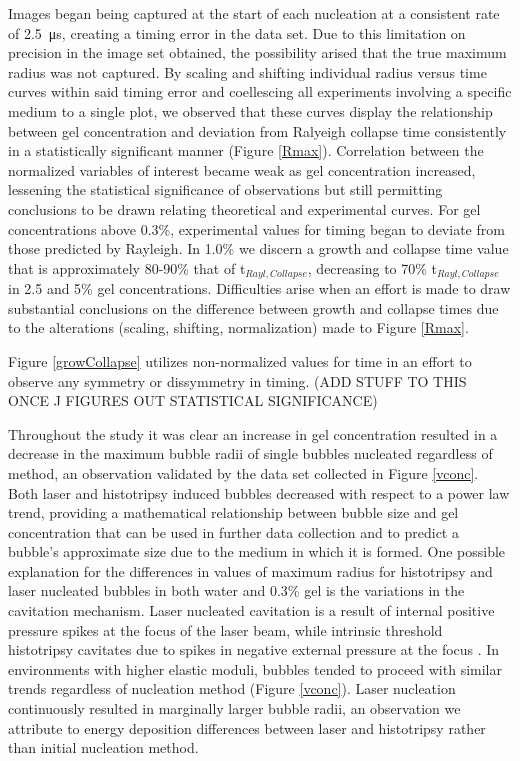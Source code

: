 \documentclass[prl,aps,epsf,twocolumn,superscriptaddress]{revtex4-1}
\begin{document}
Images began being captured at the start of each nucleation at a consistent rate of \SI{2.5}{\us}, creating a timing error in the data set. Due to this limitation on precision in the image set obtained, the possibility arised that the true maximum radius was not captured. By scaling and shifting individual radius versus time curves within said timing error and coellescing all experiments involving a specific medium to a single plot, we observed that these curves display the relationship between gel concentration and deviation from Ralyeigh collapse time consistently in a statistically significant manner (Figure \ref{Rmax}). Correlation between the normalized variables of interest became weak as gel concentration increased, lessening the statistical significance of observations but still permitting conclusions to be drawn relating theoretical and experimental curves. For gel concentrations above 0.3\%, experimental values for timing began to deviate from those predicted by Rayleigh. In 1.0\% we discern a growth and collapse time value that is approximately 80-90\% that of t$_{Rayl,Collapse}$, decreasing to 70\% t$_{Rayl,Collapse}$ in 2.5 and 5\% gel concentrations. Difficulties arise when an effort is made to draw substantial conclusions on the difference between growth and collapse times due to the alterations (scaling, shifting, normalization) made to Figure \ref{Rmax}. 

Figure \ref{growCollapse} utilizes non-normalized values for time in an effort to observe any symmetry or dissymmetry in timing. (ADD STUFF TO THIS ONCE J FIGURES OUT STATISTICAL SIGNIFICANCE)

Throughout the study it was clear an increase in gel concentration resulted in a decrease in the maximum bubble radii of single bubbles nucleated regardless of method, an observation validated by the data set collected in Figure \ref{vconc}. Both laser and histotripsy induced bubbles decreased with respect to a power law trend, providing a mathematical relationship between bubble size and gel concentration that can be used in further data collection and to predict a bubble's approximate size due to the medium in which it is formed. One possible explanation for the differences in values of maximum radius for histotripsy and laser nucleated bubbles in both water and 0.3\% gel is the variations in the cavitation mechanism. Laser nucleated cavitation is a result of internal positive pressure spikes at the focus of the laser beam, while intrinsic threshold histotripsy cavitates due to spikes in negative external pressure at the focus \cite{sukovich2011pressure}. In environments with higher elastic moduli, bubbles tended to proceed with similar trends regardless of nucleation method (Figure \ref{vconc}). Laser nucleation continuously resulted in marginally larger bubble radii, an observation we attribute to energy deposition differences between laser and histotripsy rather than initial nucleation method. 
\end{document}
